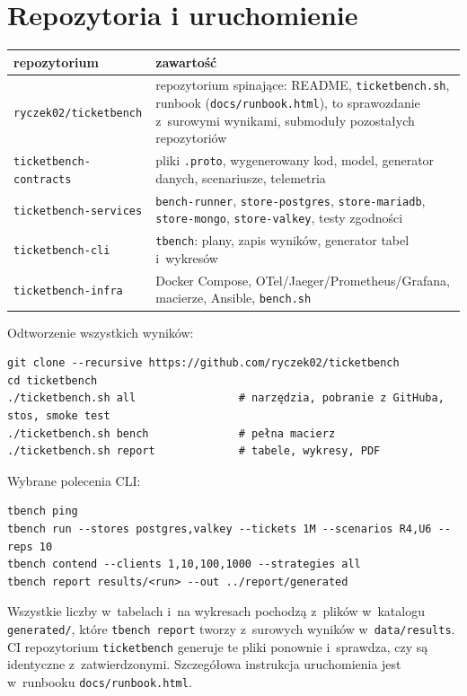 \section{Repozytoria i uruchomienie}

\begin{table}[H]
\centering
\small
\begin{tabular}{lp{10.5cm}}
\toprule
repozytorium & zawartość \\
\midrule
\texttt{ryczek02/ticketbench} & repozytorium spinające: README, \texttt{ticketbench.sh}, runbook (\texttt{docs/runbook.html}), to sprawozdanie z~surowymi wynikami, submoduły pozostałych repozytoriów \\
\texttt{ticketbench-contracts} & pliki \texttt{.proto}, wygenerowany kod, model, generator danych, scenariusze, telemetria \\
\texttt{ticketbench-services} & \texttt{bench-runner}, \texttt{store-postgres}, \texttt{store-mariadb}, \texttt{store-mongo}, \texttt{store-valkey}, testy zgodności \\
\texttt{ticketbench-cli} & \texttt{tbench}: plany, zapis wyników, generator tabel i~wykresów \\
\texttt{ticketbench-infra} & Docker Compose, OTel/Jaeger/Prometheus/Grafana, macierze, Ansible, \texttt{bench.sh} \\
\bottomrule
\end{tabular}
\end{table}

Odtworzenie wszystkich wyników:
\begin{Verbatim}[frame=single,fontsize=\small]
git clone --recursive https://github.com/ryczek02/ticketbench
cd ticketbench
./ticketbench.sh all                # narzędzia, pobranie z GitHuba, stos, smoke test
./ticketbench.sh bench              # pełna macierz
./ticketbench.sh report             # tabele, wykresy, PDF
\end{Verbatim}

Wybrane polecenia CLI:
\begin{Verbatim}[frame=single,fontsize=\small]
tbench ping
tbench run --stores postgres,valkey --tickets 1M --scenarios R4,U6 --reps 10
tbench contend --clients 1,10,100,1000 --strategies all
tbench report results/<run> --out ../report/generated
\end{Verbatim}

Wszystkie liczby w~tabelach i~na wykresach pochodzą z~plików w~katalogu
\texttt{generated/}, które \texttt{tbench report} tworzy z~surowych wyników
w~\texttt{data/results}. CI repozytorium \texttt{ticketbench} generuje te pliki
ponownie i~sprawdza, czy są identyczne z~zatwierdzonymi. Szczegółowa instrukcja
uruchomienia jest w~runbooku \texttt{docs/runbook.html}.
